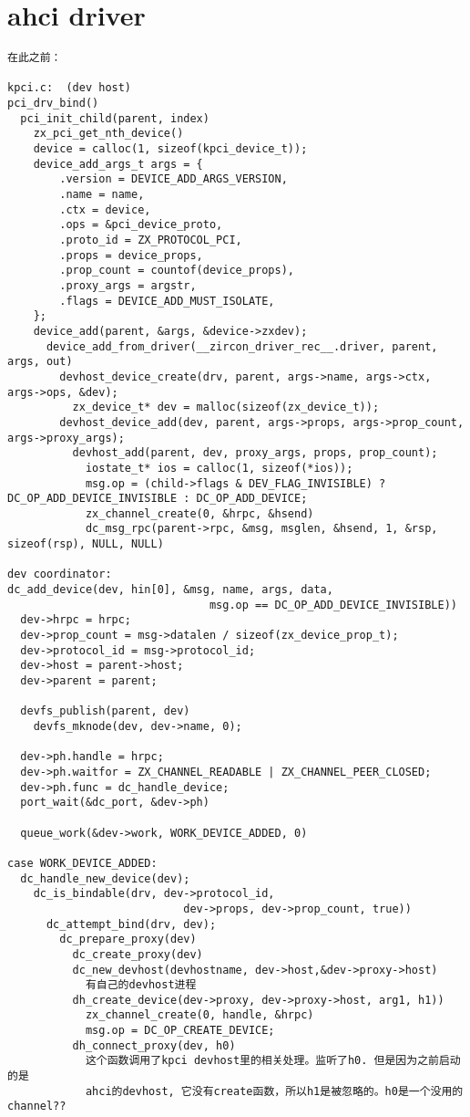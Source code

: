 \section{ahci driver}

\begin{verbatim}
在此之前：

kpci.c:  (dev host)
pci_drv_bind()
  pci_init_child(parent, index)
    zx_pci_get_nth_device()
    device = calloc(1, sizeof(kpci_device_t));
    device_add_args_t args = {
        .version = DEVICE_ADD_ARGS_VERSION,
        .name = name,
        .ctx = device,
        .ops = &pci_device_proto,
        .proto_id = ZX_PROTOCOL_PCI,
        .props = device_props,
        .prop_count = countof(device_props),
        .proxy_args = argstr,
        .flags = DEVICE_ADD_MUST_ISOLATE,
    };
    device_add(parent, &args, &device->zxdev);
      device_add_from_driver(__zircon_driver_rec__.driver, parent, args, out)
        devhost_device_create(drv, parent, args->name, args->ctx, args->ops, &dev);
          zx_device_t* dev = malloc(sizeof(zx_device_t));
        devhost_device_add(dev, parent, args->props, args->prop_count, args->proxy_args);
          devhost_add(parent, dev, proxy_args, props, prop_count);
            iostate_t* ios = calloc(1, sizeof(*ios));
            msg.op = (child->flags & DEV_FLAG_INVISIBLE) ? DC_OP_ADD_DEVICE_INVISIBLE : DC_OP_ADD_DEVICE;
            zx_channel_create(0, &hrpc, &hsend)
            dc_msg_rpc(parent->rpc, &msg, msglen, &hsend, 1, &rsp, sizeof(rsp), NULL, NULL)

dev coordinator:
dc_add_device(dev, hin[0], &msg, name, args, data,
                               msg.op == DC_OP_ADD_DEVICE_INVISIBLE))
  dev->hrpc = hrpc;
  dev->prop_count = msg->datalen / sizeof(zx_device_prop_t);
  dev->protocol_id = msg->protocol_id;
  dev->host = parent->host;
  dev->parent = parent;

  devfs_publish(parent, dev)
    devfs_mknode(dev, dev->name, 0);
    
  dev->ph.handle = hrpc;
  dev->ph.waitfor = ZX_CHANNEL_READABLE | ZX_CHANNEL_PEER_CLOSED;
  dev->ph.func = dc_handle_device;
  port_wait(&dc_port, &dev->ph)

  queue_work(&dev->work, WORK_DEVICE_ADDED, 0)

case WORK_DEVICE_ADDED:
  dc_handle_new_device(dev);
    dc_is_bindable(drv, dev->protocol_id,
                           dev->props, dev->prop_count, true))
      dc_attempt_bind(drv, dev);
        dc_prepare_proxy(dev)
          dc_create_proxy(dev)
          dc_new_devhost(devhostname, dev->host,&dev->proxy->host) 
            有自己的devhost进程
          dh_create_device(dev->proxy, dev->proxy->host, arg1, h1))
            zx_channel_create(0, handle, &hrpc)
            msg.op = DC_OP_CREATE_DEVICE;
          dh_connect_proxy(dev, h0)
            这个函数调用了kpci devhost里的相关处理。监听了h0. 但是因为之前启动的是
            ahci的devhost, 它没有create函数，所以h1是被忽略的。h0是一个没用的channel??


\end{verbatim}
